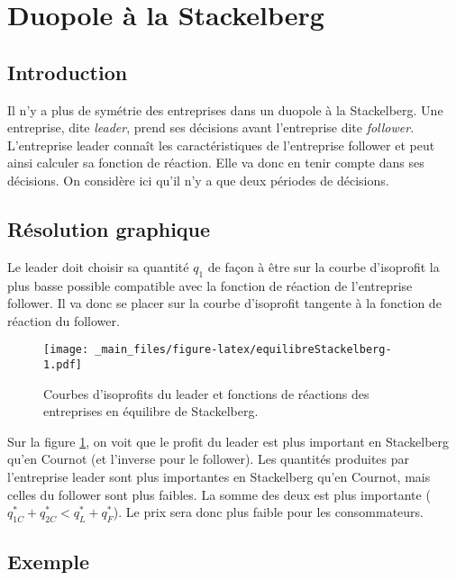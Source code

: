 \documentclass[
]{book}
\theoremstyle{definition}
\theoremstyle{definition}
\theoremstyle{definition}
\theoremstyle{definition}
\theoremstyle{remark}
\begin{document}
\hypertarget{duopole-uxe0-la-stackelberg}{%
\section{Duopole à la Stackelberg}\label{duopole-uxe0-la-stackelberg}}

\hypertarget{introduction-2}{%
\subsection{Introduction}\label{introduction-2}}

Il n'y a plus de symétrie des entreprises dans un duopole à la Stackelberg.
Une entreprise, dite \emph{leader}, prend ses décisions avant l'entreprise dite \emph{follower}.
L'entreprise leader connaît les caractéristiques de l'entreprise follower et peut ainsi calculer sa fonction de réaction.
Elle va donc en tenir compte dans ses décisions.
On considère ici qu'il n'y a que deux périodes de décisions.

\hypertarget{ruxe9solution-graphique}{%
\subsection{Résolution graphique}\label{ruxe9solution-graphique}}

Le leader doit choisir sa quantité \(q_1\) de façon à être sur la courbe d'isoprofit la plus basse possible compatible avec la fonction de réaction de l'entreprise follower.
Il va donc se placer sur la courbe d'isoprofit tangente à la fonction de réaction du follower.

\begin{figure}
\centering
\texttt{[image: \_main\_files/figure-latex/equilibreStackelberg-1.pdf]}
\caption{\label{fig:equilibreStackelberg}Courbes d'isoprofits du leader et fonctions de réactions des entreprises en équilibre de Stackelberg.}
\end{figure}

Sur la figure \ref{fig:equilibreStackelberg}, on voit que le profit du leader est plus important en Stackelberg qu'en Cournot (et l'inverse pour le follower).
Les quantités produites par l'entreprise leader sont plus importantes en Stackelberg qu'en Cournot, mais celles du follower sont plus faibles.
La somme des deux est plus importante (\(q_{1C}^*+q_{2C}^*<q_{L}^*+q_{F}^*\)).
Le prix sera donc plus faible pour les consommateurs.

\hypertarget{exemple-1}{%
\subsection{Exemple}\label{exemple-1}}
\end{document}
